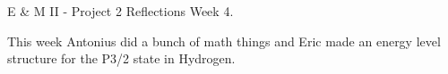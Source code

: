 \documentclass[11pt]{article}
\begin{document}
 

\begin{center}
	{\Large E \& M II - Project 2 Reflections Week 4.}
\end{center}

This week Antonius did a bunch of math things and Eric made an energy level structure for the P3/2 state in Hydrogen.


\end{document}
